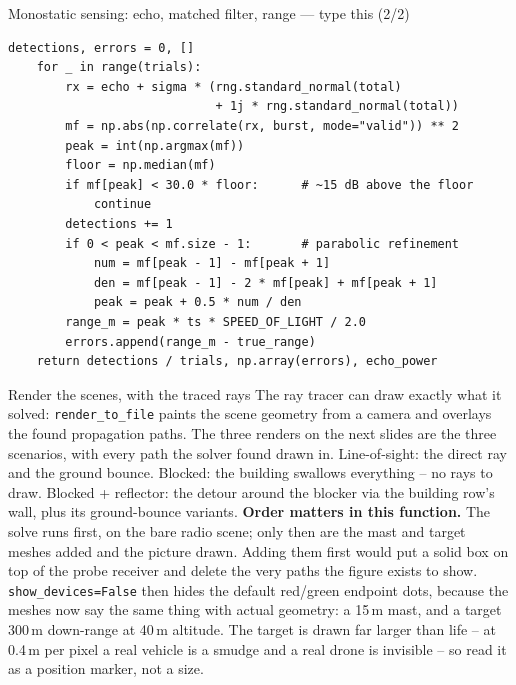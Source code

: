\documentclass[10pt]{beamer}
\begin{document}
\begin{frame}[fragile]{Monostatic sensing: echo, matched filter, range --- type this (2/2)}
\begin{lstlisting}[basicstyle=\ttfamily\tiny]
    detections, errors = 0, []
    for _ in range(trials):
        rx = echo + sigma * (rng.standard_normal(total)
                             + 1j * rng.standard_normal(total))
        mf = np.abs(np.correlate(rx, burst, mode="valid")) ** 2
        peak = int(np.argmax(mf))
        floor = np.median(mf)
        if mf[peak] < 30.0 * floor:      # ~15 dB above the floor
            continue
        detections += 1
        if 0 < peak < mf.size - 1:       # parabolic refinement
            num = mf[peak - 1] - mf[peak + 1]
            den = mf[peak - 1] - 2 * mf[peak] + mf[peak + 1]
            peak = peak + 0.5 * num / den
        range_m = peak * ts * SPEED_OF_LIGHT / 2.0
        errors.append(range_m - true_range)
    return detections / trials, np.array(errors), echo_power
\end{lstlisting}
\end{frame}

\begin{frame}{Render the scenes, with the traced rays}
  The ray tracer can draw exactly what it solved:
  \texttt{render\_to\_file} paints the scene geometry from
  a camera and overlays the found propagation paths. The
  three renders on the next slides are the three scenarios,
  with every path the solver found drawn in. Line-of-sight:
  the direct ray and the ground bounce. Blocked: the
  building swallows everything -- no rays to draw. Blocked
  + reflector: the detour around the blocker via the
  building row's wall, plus its ground-bounce variants.
  \textbf{Order matters in this function.} The solve runs
  first, on the bare radio scene; only then are the mast
  and target meshes added and the picture drawn. Adding
  them first would put a solid box on top of the probe
  receiver and delete the very paths the figure exists to
  show. \texttt{show\_devices=False} then hides the
  default red/green endpoint dots, because the meshes now
  say the same thing with actual geometry: a 15\,m mast,
  and a target 300\,m down-range at 40\,m altitude. The
  target is drawn far larger than life -- at 0.4\,m per
  pixel a real vehicle is a smudge and a real drone is
  invisible -- so read it as a position marker, not a size.
\end{frame}
\end{document}
